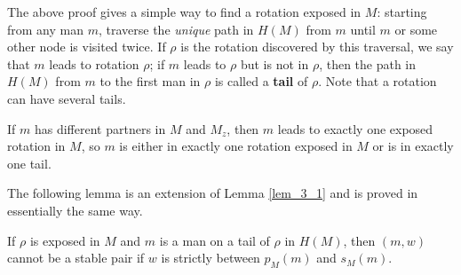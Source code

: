 The above proof gives a simple way to find a rotation exposed in $M$: starting from any man $m$, traverse the \textit{unique} path in $H(M)$ from $m$ until $m$ or some other node is visited twice. If $\rho$ is the rotation discovered by this traversal, we say that $m$ leads to rotation $\rho$; if $m$ leads to $\rho$ but is not in $\rho$, then the path in $H(M)$ from $m$ to the first man in $\rho$ is called a \textbf{tail} of $\rho$. Note that a rotation can have several tails. 

\begin{corollary}\label{cor_3_1}
If $m$ has different partners in $M$ and $M_z$, then $m$ leads to exactly one exposed rotation in $M$, so $m$ is either in exactly one rotation exposed in $M$ or is in exactly one tail.
\end{corollary}

The following lemma is an extension of Lemma \ref{lem_3_1} and is proved in essentially the same way.

\begin{lemma}\label{lem_3_4}
    If $\rho$ is exposed in $M$ and $m$ is a man on a tail of $\rho$ in $H(M)$, then $(m, w)$ cannot be a stable pair if $w$ is strictly between $p_M(m)$ and $s_M(m)$.
\end{lemma}

